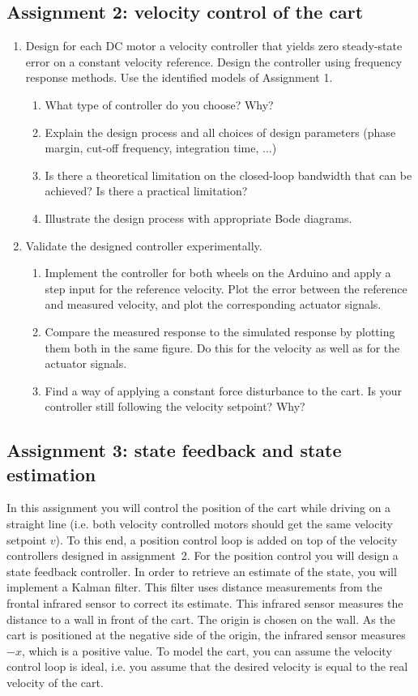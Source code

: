 \documentclass[10pt,a4paper]{article}
\begin{document}
\subsection{Assignment 2: velocity control of the cart}
\begin{enumerate}
  \item Design for each DC motor a velocity controller that yields zero steady-state error on a constant velocity reference. Design the controller using frequency response methods. Use the identified models of Assignment 1.
  \begin{enumerate}
    \item What type of controller do you choose? Why?
    \item Explain the design process and all choices of design parameters (phase margin, cut-off frequency, integration time, ...)
    \item Is there a theoretical limitation on the closed-loop bandwidth that can be achieved? Is there a practical limitation?
    \item Illustrate the design process with appropriate Bode diagrams.
  \end{enumerate}
  \item Validate the designed controller experimentally.
  \begin{enumerate}
    \item Implement the controller for both wheels on the Arduino and apply a step input for the reference velocity. Plot the error between the reference and measured velocity, and plot the corresponding actuator signals.
		\item Compare the measured response to the simulated response by plotting them both in the same figure. Do this for the velocity as well as for the actuator signals.
    \item Find a way of applying a constant force disturbance to the cart. Is your controller still following the velocity setpoint? Why?
  \end{enumerate}
\end{enumerate}

\subsection{Assignment 3: state feedback and state estimation}
In this assignment you will control the position of the cart while driving on a straight line (i.e. both velocity controlled motors should get the same velocity setpoint $v$). To this end, a position control loop is added on top of the velocity controllers designed in assignment~2. For the position control you will design a state feedback controller. In order to retrieve an estimate of the state, you will implement a Kalman filter. This filter uses distance measurements from the frontal infrared sensor to correct its estimate. This infrared sensor measures the distance to a wall in front of the cart. The origin is chosen on the wall. As the cart is positioned at the negative side of the origin, the infrared sensor measures $-x$, which is a positive value. To model the cart, you can assume the velocity control loop is ideal, i.e. you assume that the desired velocity is equal to the real velocity of the cart.
\end{document}
